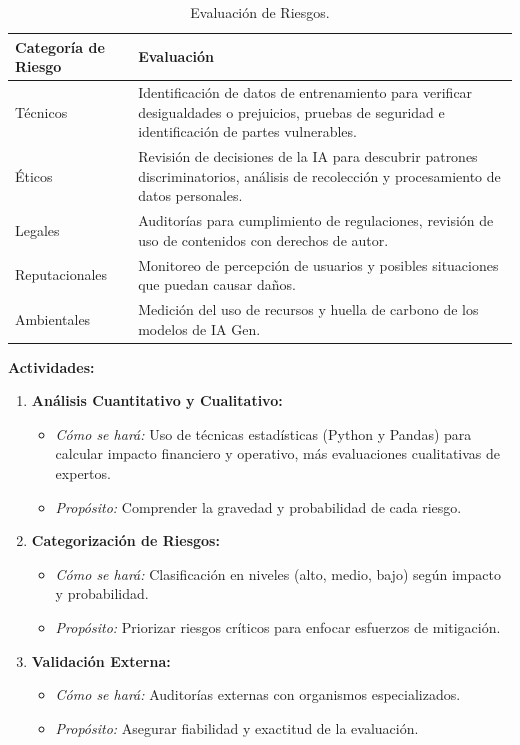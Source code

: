 \documentclass[12pt]{article}
\begin{document}
\begin{table}[h]
    \centering
    \begin{tabular}{p{3cm}p{11cm}}
        \toprule
        \textbf{Categoría de Riesgo} & \textbf{Evaluación} \\
        \midrule
        Técnicos & Identificación de datos de entrenamiento para verificar desigualdades o prejuicios, pruebas de seguridad e identificación de partes vulnerables. \\
        Éticos & Revisión de decisiones de la IA para descubrir patrones discriminatorios, análisis de recolección y procesamiento de datos personales. \\
        Legales & Auditorías para cumplimiento de regulaciones, revisión de uso de contenidos con derechos de autor. \\
        Reputacionales & Monitoreo de percepción de usuarios y posibles situaciones que puedan causar daños. \\
        Ambientales & Medición del uso de recursos y huella de carbono de los modelos de IA Gen. \\
        \bottomrule
    \end{tabular}
    \caption{Evaluación de Riesgos.}
    \label{tab:evaluacion_riesgos}
\end{table}

\textbf{Actividades:}
\begin{enumerate}
    \item \textbf{Análisis Cuantitativo y Cualitativo:}
        \begin{itemize}
            \item \textit{Cómo se hará:} Uso de técnicas estadísticas (Python y Pandas) para calcular impacto financiero y operativo, más evaluaciones cualitativas de expertos.
            \item \textit{Propósito:} Comprender la gravedad y probabilidad de cada riesgo.
        \end{itemize}
    \item \textbf{Categorización de Riesgos:}
        \begin{itemize}
            \item \textit{Cómo se hará:} Clasificación en niveles (alto, medio, bajo) según impacto y probabilidad.
            \item \textit{Propósito:} Priorizar riesgos críticos para enfocar esfuerzos de mitigación.
        \end{itemize}
    \item \textbf{Validación Externa:}
        \begin{itemize}
            \item \textit{Cómo se hará:} Auditorías externas con organismos especializados.
            \item \textit{Propósito:} Asegurar fiabilidad y exactitud de la evaluación.
        \end{itemize}
\end{enumerate}
\end{document}
